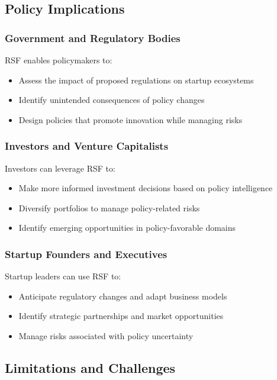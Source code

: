 \subsection{Policy Implications}

\subsubsection{Government and Regulatory Bodies}
RSF enables policymakers to:
\begin{itemize}
    \item Assess the impact of proposed regulations on startup ecosystems
    \item Identify unintended consequences of policy changes
    \item Design policies that promote innovation while managing risks
\end{itemize}

\subsubsection{Investors and Venture Capitalists}
Investors can leverage RSF to:
\begin{itemize}
    \item Make more informed investment decisions based on policy intelligence
    \item Diversify portfolios to manage policy-related risks
    \item Identify emerging opportunities in policy-favorable domains
\end{itemize}

\subsubsection{Startup Founders and Executives}
Startup leaders can use RSF to:
\begin{itemize}
    \item Anticipate regulatory changes and adapt business models
    \item Identify strategic partnerships and market opportunities
    \item Manage risks associated with policy uncertainty
\end{itemize}

\subsection{Limitations and Challenges}

